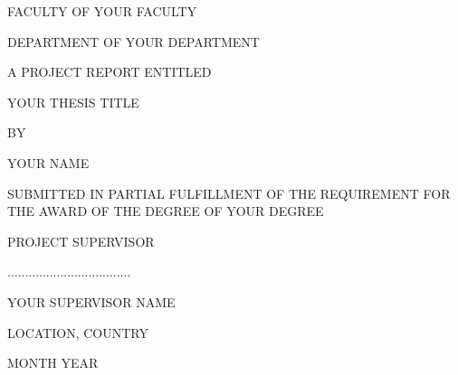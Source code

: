 
\begin{coverpage}
	\vspace{-3.0cm}

	
	\vspace{1.0cm}
	
	FACULTY OF YOUR FACULTY
	
	DEPARTMENT OF YOUR DEPARTMENT
	\vspace{1.5cm}
	
	A PROJECT REPORT ENTITLED 
	
	YOUR THESIS TITLE
	\vspace{1.0cm}
	
	BY
	 
	YOUR NAME
	\vspace{1.5cm}
	
	SUBMITTED IN PARTIAL FULFILLMENT OF THE REQUIREMENT FOR THE
	AWARD OF THE DEGREE OF YOUR DEGREE 
	
	\vspace{1.5cm}
	PROJECT SUPERVISOR
	\vspace{1.0cm}
	  
	...................................
	
	YOUR SUPERVISOR NAME

	\vspace{1.0cm}

	LOCATION, COUNTRY
	
	MONTH YEAR
	
\end{coverpage}	

